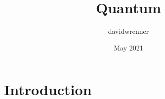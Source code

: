 \documentclass{article}
\title{Quantum}
\author{davidwrenner }
\date{May 2021}
\begin{document}
\maketitle

\section{Introduction}
\end{document}
